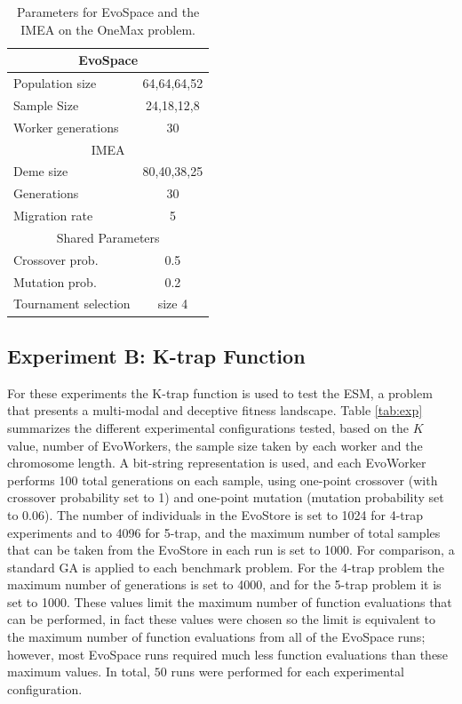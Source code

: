 \begin{table}[t]
\renewcommand{\arraystretch}{1.3}
\caption{Parameters for EvoSpace and the IMEA on the OneMax problem.}
\label{tab:exp3}
\centering
\begin{tabular}{|l||c|}
\hline
\multicolumn{2}{|c|}{EvoSpace} \\
\hline
Population size & 64,64,64,52 \\
Sample Size & 24,18,12,8 \\
Worker generations & 30 \\
\hline
\multicolumn{2}{|c|}{IMEA} \\
\hline
Deme size & 80,40,38,25 \\
Generations & 30 \\
Migration rate & 5 \\
\hline
\multicolumn{2}{|c|}{Shared Parameters} \\
\hline
Crossover prob. & 0.5 \\
Mutation prob.  & 0.2 \\
Tournament selection & size 4 \\
\hline
\end{tabular}
\end{table}


\subsection{Experiment B: K-trap Function}
For these experiments the K-trap function is used to test the ESM, a problem that presents a multi-modal and deceptive fitness landscape.
Table \ref{tab:exp} summarizes the different experimental configurations tested, based on the $K$ value, number of EvoWorkers, the sample size taken by each worker and the chromosome length.
A bit-string representation is used, and each EvoWorker performs 100 total generations on each sample,
using one-point crossover (with crossover probability set to 1) and one-point mutation (mutation probability set to 0.06).
The number of individuals in the EvoStore is set to 1024 for 4-trap experiments and to 4096 for 5-trap,
and the maximum number of total samples that can be taken from the EvoStore in each run is set to 1000.
For comparison, a standard GA is applied to each benchmark problem.
For the 4-trap problem the maximum number of generations is set to 4000, and for the 5-trap problem it is set to 1000.
These values limit the maximum number of function evaluations that can be performed, in fact these values were chosen so the limit is equivalent to the
maximum number of function evaluations from all of the EvoSpace runs; however, most EvoSpace runs required much less function evaluations than these maximum values.
In total, $50$ runs were performed for each experimental configuration.


